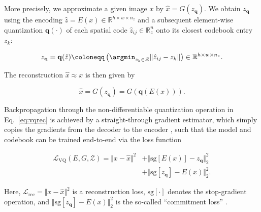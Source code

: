 More precisely, we approximate a given image $x$ by $\hat{x}=G(z_{\mathbf{q}})$. We obtain $z_{\mathbf{q}}$ using the encoding $ \hat{z} = E(x) \in \mathbb{R}^{h\times w \times
n_z}$ and a subsequent element-wise quantization $\mathbf{q}(\cdot)$ of each spatial code
$\hat{z}_{ij} \in \mathbb{R}^n_z$ onto its closest codebook entry $z_k$:

\begin{equation}
  z_{\mathbf{q}} = \mathbf{q}(\hat{z}) \coloneqq
  \left(\argmin_{z_k \in \mathcal{Z}} \Vert \hat{z}_{ij} - z_k \Vert\right)
  \in \mathbb{R}^{h\times w \times n_z}.
\end{equation}

 
The reconstruction $\hat{x} \approx x$ is then given by

\begin{equation}

  \hat{x} = G(z_{\mathbf{q}} ) = G\left(
    \mathbf{q}(E(x)) \right).
\label{eq:vqrec}
\end{equation}

Backpropagation through the non-differentiable quantization operation in
Eq.~\eqref{eq:vqrec} is achieved by a straight-through gradient estimator, which simply copies the gradients from the decoder to the encoder \cite{bengio2013estimating}, such that the model and codebook can be trained end-to-end via the loss function

\begin{align}

\mathcal{L}_{\text{VQ}}(E, G, \mathcal{Z}) = \Vert x - \hat{x} \Vert^2 
  &+ \Vert \text{sg}[E(x)] - z_{\mathbf{q}} \Vert_2^2 \nonumber \\ &+ \Vert \text{sg}[z_{\mathbf{q}}] - E(x) \Vert_2^2.
\label{eq:origvqloss}
\end{align}

Here, $\mathcal{L}_{\text{rec}}=\Vert x - \hat{x} \Vert^2$ is a reconstruction loss,
$\text{sg}[\cdot]$ denotes the stop-gradient operation, and
$\Vert \text{sg}[z_{\mathbf{q}}] - E(x) \Vert_2^2$ is the so-called ``commitment loss'' \cite{oord2018neural}.

